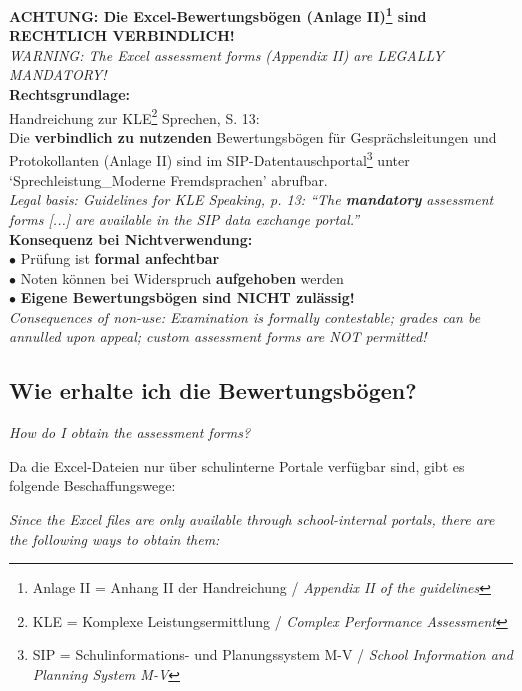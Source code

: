 \documentclass[11pt,a4paper]{article}
\newcommand{\bipar}[2]{%
    #1\par\vspace{2pt}%
    {\small\color{englishgray}\textit{#2}}\par\vspace{8pt}%
}
\newcommand{\bisubsection}[2]{%
    \subsection{#1}%
    {\small\color{englishgray}\textit{#2}}\par\vspace{4pt}%
}
\begin{document}
\begin{kritischbox}
\textbf{ACHTUNG: Die Excel-Bewertungsbögen (Anlage II)\footnote{Anlage II = Anhang II der Handreichung / \textit{Appendix II of the guidelines}} sind RECHTLICH VERBINDLICH!}\\[0.3cm]
{\color{englishgray}\textit{WARNING: The Excel assessment forms (Appendix II) are LEGALLY MANDATORY!}}\\[0.5cm]

\textbf{Rechtsgrundlage:}\\
Handreichung zur KLE\footnote{KLE = Komplexe Leistungsermittlung / \textit{Complex Performance Assessment}} Sprechen, S. 13:\\
\glqq Die \textbf{verbindlich zu nutzenden} Bewertungsbögen für Gesprächsleitungen und Protokollanten (Anlage II) sind im SIP-Datentauschportal\footnote{SIP = Schulinformations- und Planungssystem M-V / \textit{School Information and Planning System M-V}} unter `Sprechleistung\_Moderne Fremdsprachen' abrufbar.\grqq\\[0.3cm]
{\color{englishgray}\textit{Legal basis: Guidelines for KLE Speaking, p. 13: ``The \textbf{mandatory} assessment forms [...] are available in the SIP data exchange portal.''}}\\[0.5cm]

\textbf{Konsequenz bei Nichtverwendung:}\\
$\bullet$ Prüfung ist \textbf{formal anfechtbar}\\
$\bullet$ Noten können bei Widerspruch \textbf{aufgehoben} werden\\
$\bullet$ \textbf{Eigene Bewertungsbögen sind NICHT zulässig!}\\[0.3cm]
{\color{englishgray}\textit{Consequences of non-use: Examination is formally contestable; grades can be annulled upon appeal; custom assessment forms are NOT permitted!}}
\end{kritischbox}

\vspace{0.5cm}

\bisubsection{Wie erhalte ich die Bewertungsbögen?}{How do I obtain the assessment forms?}

\bipar{Da die Excel-Dateien nur über schulinterne Portale verfügbar sind, gibt es folgende Beschaffungswege:}{Since the Excel files are only available through school-internal portals, there are the following ways to obtain them:}
\end{document}
